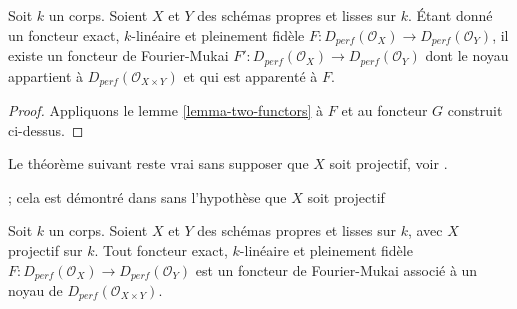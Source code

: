\begin{lemma}
\label{lemma-fully-faithful}
Soit $k$ un corps. Soient $X$ et $Y$ des schémas propres et lisses sur $k$.
Étant donné un foncteur exact, $k$-linéaire et pleinement fidèle
$F : D_{perf}(\mathcal{O}_X) \to D_{perf}(\mathcal{O}_Y)$,
il existe un foncteur de Fourier-Mukai
$F' : D_{perf}(\mathcal{O}_X) \to D_{perf}(\mathcal{O}_Y)$ dont le noyau
appartient à $D_{perf}(\mathcal{O}_{X \times Y})$ et qui est apparenté à $F$.
\end{lemma}

\begin{proof}
Appliquons le lemme \ref{lemma-two-functors} à $F$ et au foncteur
$G$ construit ci-dessus.
\end{proof}

\noindent
Le théorème suivant reste vrai sans supposer que $X$ soit projectif,
voir \cite{Noah}.

\begin{theorem}[Orlov]
\label{theorem-fully-faithful}
\begin{reference}
\cite[Théorème 2.2]{Orlov-K3} ; cela est démontré dans \cite{Noah}
sans l'hypothèse que $X$ soit projectif
\end{reference}
Soit $k$ un corps. Soient $X$ et $Y$ des schémas propres et lisses sur $k$,
avec $X$ projectif sur $k$. Tout foncteur exact, $k$-linéaire et pleinement fidèle
$F : D_{perf}(\mathcal{O}_X) \to D_{perf}(\mathcal{O}_Y)$
est un foncteur de Fourier-Mukai associé à un noyau de
$D_{perf}(\mathcal{O}_{X \times Y})$.
\end{theorem}

